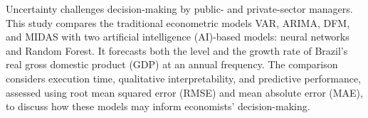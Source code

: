 	Uncertainty challenges decision-making by public- and private-sector managers. This study compares the traditional econometric models VAR, ARIMA, DFM, and MIDAS with two artificial intelligence (AI)-based models: neural networks and Random Forest. It forecasts both the level and the growth rate of Brazil's real gross domestic product (GDP) at an annual frequency. The comparison considers execution time, qualitative interpretability, and predictive performance, assessed using root mean squared error (RMSE) and mean absolute error (MAE), to discuss how these models may inform economists' decision-making.
	
